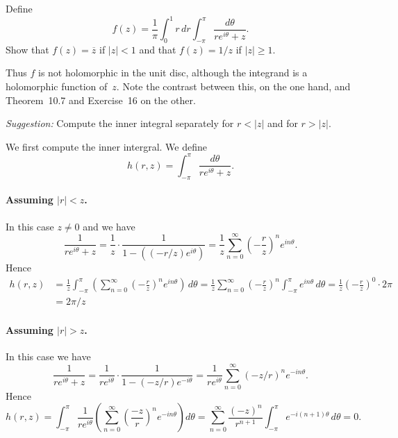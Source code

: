 \begin{enumerate}
\begin{excopy}
Define 
\begin{equation*}
f(z) = \frac{1}{\pi} \int_0^1 r\,dr \int_{-\pi}^\pi \frac{d\theta}{re^{i\theta}+z}.
\end{equation*}
Show that \(f(z) = \overline{z}\) if \(|z|<1\) and that 
\(f(z) = 1/z\) if \(|z|\geq 1\).

Thus $f$ is not holomorphic in the unit disc, 
although the integrand is a holomorphic function of~$z$. 
Note the contrast between this, on the one hand, and Theorem~10.7 
and Exercise~16 on the other.

\emph{Suggestion:} Compute the inner integral separately 
for \(r<|z|\) and for \(r>|z|\).
\end{excopy}

We first compute the inner intergral. We define
\begin{equation*}
h(r,z) = \int_{-\pi}^\pi \frac{d\theta}{re^{i\theta}+z}.
\end{equation*}
\paragraph{Assuming \(|r|<z\).} In this case \(z\neq 0\) and we have
\begin{equation*}
\frac{1}{re^{i\theta}+z}
= \frac{1}{z}\cdot\frac{1}{1-((-r/z)e^{i\theta})}
= \frac{1}{z}\sum_{n=0}^\infty \left(-\frac{r}{z}\right)^n e^{in\theta}.
\end{equation*}
Hence
\begin{align*}
h(r,z)
&= \frac{1}{z} \int_{-\pi}^\pi
    \left( \sum_{n=0}^\infty \left(-\frac{r}{z}\right)^n e^{in\theta} 
    \right)\,d\theta
 = \frac{1}{z} \sum_{n=0}^\infty \left(-\frac{r}{z}\right)^n 
     \int_{-\pi}^\pi e^{in\theta} \,d\theta
 = \frac{1}{z} \left(-\frac{r}{z}\right)^0 \cdot 2\pi \\
&= 2\pi/z
\end{align*}


\paragraph{Assuming \(|r|>z\).} In this case we have
\begin{equation*}
\frac{1}{re^{i\theta}+z}
= \frac{1}{re^{i\theta}}\cdot\frac{1}{1-(-z/r)e^{-i\theta}}
= \frac{1}{re^{i\theta}}\sum_{n=0}^\infty (-z/r)^n e^{-in\theta}.
\end{equation*}
Hence
\begin{equation*}
h(r,z)
 = \int_{-\pi}^\pi \frac{1}{re^{i\theta}}
    \left(\sum_{n=0}^\infty \left(\frac{-z}{r}\right)^n e^{-in\theta}\right) d\theta 
 = \sum_{n=0}^\infty \frac{(-z)^n}{r^{n+1}}
    \int_{-\pi}^\pi e^{-i(n+1)\theta}\,d\theta 
 = 0.
\end{equation*}


\end{enumerate}
